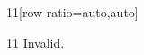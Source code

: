 \documentclass[paper=A4]{ropas-poster}
\begin{document}
\begin{postergrid}{1}{1}[row-ratio={auto,auto}]
\begin{posterblock}{1}{1}
Invalid.
\end{posterblock}
\end{postergrid}
\end{document}
